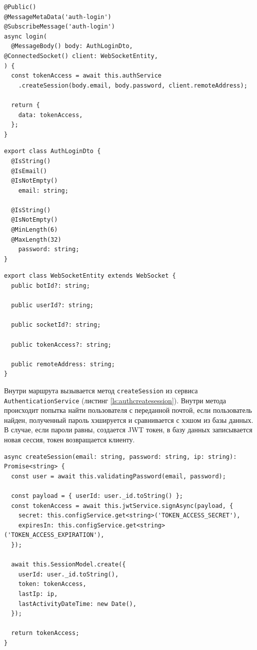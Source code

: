 \begin{lstlisting}[caption={Определение маршрута входа}, label={ls:authgatewaylogin}]
@Public()
@MessageMetaData('auth-login')
@SubscribeMessage('auth-login')
async login(
  @MessageBody() body: AuthLoginDto,
@ConnectedSocket() client: WebSocketEntity,
) {
  const tokenAccess = await this.authService
    .createSession(body.email, body.password, client.remoteAddress);

  return {
    data: tokenAccess,
  };
}
\end{lstlisting}

\begin{lstlisting}[caption={Модель входных данных маршрута входа}, label={ls:authgatewaylogindto}]
export class AuthLoginDto {
  @IsString()
  @IsEmail()
  @IsNotEmpty()
    email: string;

  @IsString()
  @IsNotEmpty()
  @MinLength(6)
  @MaxLength(32)
    password: string;
}
\end{lstlisting}

\begin{lstlisting}[caption={Модель данных клиента}, label={ls:authgatewayloginclient}]
export class WebSocketEntity extends WebSocket {
  public botId?: string;

  public userId?: string;

  public socketId?: string;

  public tokenAccess?: string;

  public remoteAddress: string;
}
\end{lstlisting}

Внутри маршрута вызывается метод \verb|createSession| из сервиса \verb|AuthenticationService| (листинг \ref{ls:authcreatesession}). Внутри метода происходит попытка найти пользователя с переданной почтой, если пользователь найден, полученный пароль хэшируется и сравнивается с хэшом из базы данных. В случае, если пароли равны, создается JWT токен, в базу данных записывается новая сессия, токен возвращается клиенту.

\begin{lstlisting}[caption={Метод создания пользовательской сессии}, label={ls:authcreatesession}]
async createSession(email: string, password: string, ip: string): Promise<string> {
  const user = await this.validatingPassword(email, password);

  const payload = { userId: user._id.toString() };
  const tokenAccess = await this.jwtService.signAsync(payload, {
    secret: this.configService.get<string>('TOKEN_ACCESS_SECRET'),
    expiresIn: this.configService.get<string>('TOKEN_ACCESS_EXPIRATION'),
  });

  await this.SessionModel.create({
    userId: user._id.toString(),
    token: tokenAccess,
    lastIp: ip,
    lastActivityDateTime: new Date(),
  });

  return tokenAccess;
}
\end{lstlisting}

